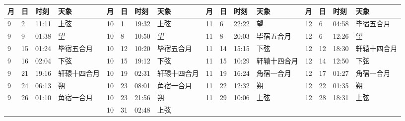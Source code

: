 \begin{tabular}{llll|llll|llll|llll}
\hline
	月 & 日 & 时刻 & 天象 &
	月 & 日 & 时刻 & 天象 &
	月 & 日 & 时刻 & 天象 &
	月 & 日 & 时刻 & 天象 \tabularnewline
\hline
9 & 2 & 11:11 & 上弦 & 10 & 1 & 19:32 & 上弦 & 11 & 6 & 22:22 & 望 & 12 & 6 & 04:58 & 毕宿五合月 \tabularnewline
9 & 9 & 01:38 & 望 & 10 & 8 & 10:50 & 望 & 11 & 8 & 20:03 & 毕宿五合月 & 12 & 6 & 12:26 & 望 \tabularnewline
9 & 15 & 01:24 & 毕宿五合月 & 10 & 12 & 10:20 & 毕宿五合月 & 11 & 14 & 15:15 & 下弦 & 12 & 12 & 18:30 & 轩辕十四合月 \tabularnewline
9 & 16 & 02:04 & 下弦 & 10 & 15 & 19:12 & 下弦 & 11 & 15 & 10:29 & 轩辕十四合月 & 12 & 14 & 12:50 & 下弦 \tabularnewline
9 & 21 & 19:16 & 轩辕十四合月 & 10 & 19 & 02:31 & 轩辕十四合月 & 11 & 19 & 16:24 & 角宿一合月 & 12 & 17 & 01:27 & 角宿一合月 \tabularnewline
9 & 24 & 06:13 & 朔 & 10 & 23 & 08:01 & 角宿一合月 & 11 & 22 & 12:32 & 朔 & 12 & 22 & 01:35 & 朔 \tabularnewline
9 & 26 & 01:10 & 角宿一合月 & 10 & 23 & 21:56 & 朔 & 11 & 29 & 10:06 & 上弦 & 12 & 28 & 18:31 & 上弦 \tabularnewline
 &  &  &  & 10 & 31 & 02:48 & 上弦 &  &  &  &  &  &  &  &  \tabularnewline
\hline \end{tabular}

